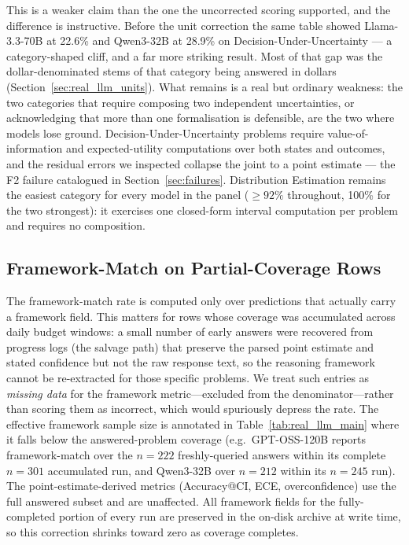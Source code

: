 \documentclass{article}
\begin{document}
This is a weaker claim than the one the uncorrected scoring supported, and the difference is instructive. Before the unit correction the same table showed Llama-3.3-70B at 22.6\% and Qwen3-32B at 28.9\% on Decision-Under-Uncertainty --- a category-shaped cliff, and a far more striking result. Most of that gap was the dollar-denominated stems of that category being answered in dollars (Section~\ref{sec:real_llm_units}). What remains is a real but ordinary weakness: the two categories that require composing two independent uncertainties, or acknowledging that more than one formalisation is defensible, are the two where models lose ground. Decision-Under-Uncertainty problems require value-of-information and expected-utility computations over both states and outcomes, and the residual errors we inspected collapse the joint to a point estimate --- the F2 failure catalogued in Section~\ref{sec:failures}. Distribution Estimation remains the easiest category for every model in the panel ($\geq 92\%$ throughout, 100\% for the two strongest): it exercises one closed-form interval computation per problem and requires no composition.

\subsection{Framework-Match on Partial-Coverage Rows}
\label{sec:real_llm_anomalies}

The framework-match rate is computed only over predictions that actually carry a framework field. This matters for rows whose coverage was accumulated across daily budget windows: a small number of early answers were recovered from progress logs (the salvage path) that preserve the parsed point estimate and stated confidence but not the raw response text, so the reasoning framework cannot be re-extracted for those specific problems. We treat such entries as \emph{missing data} for the framework metric---excluded from the denominator---rather than scoring them as incorrect, which would spuriously depress the rate. The effective framework sample size is annotated in Table~\ref{tab:real_llm_main} where it falls below the answered-problem coverage (e.g.\ GPT-OSS-120B reports framework-match over the $n = 222$ freshly-queried answers within its complete $n = 301$ accumulated run, and Qwen3-32B over $n = 212$ within its $n = 245$ run). The point-estimate-derived metrics (Accuracy@CI, ECE, overconfidence) use the full answered subset and are unaffected. All framework fields for the fully-completed portion of every run are preserved in the on-disk archive at write time, so this correction shrinks toward zero as coverage completes.
\end{document}
